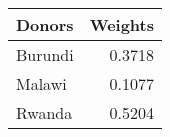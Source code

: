 \begin{tabular}{lr}
\toprule
 Donors &  Weights \\
\midrule
Burundi &   0.3718 \\
 Malawi &   0.1077 \\
 Rwanda &   0.5204 \\
\bottomrule
\end{tabular}
